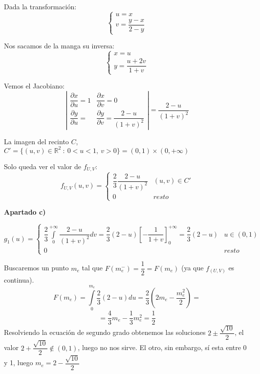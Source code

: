 \documentclass[openany]{book}
\begin{document}
\begin{exercise}
\begin{flushright}
\end{flushright}

    Dada la transformación:
    $$ \left\{
    \begin{array}{l}
        u=x\\
        v = \dfrac{y-x}{2-y}
    \end{array}
    \right. $$

    Nos sacamos de la manga su inversa:
    $$ \left\{
    \begin{array}{l}
        x=u\\
        y=\dfrac{u+2v}{1+v}
    \end{array}
    \right. $$

    Vemos el Jacobiano:
    $$\left| \begin{matrix} \dfrac{\partial x}{\partial u} = 1 & \dfrac{\partial x}{\partial v} = 0 \\ \dfrac{\partial y}{\partial u}= & \dfrac{\partial y}{\partial v} = \dfrac{2-u}{(1+v)^2} \end{matrix}\right| = \dfrac{2-u}{(1+v)^2}  $$

    La imagen del recinto $ C $, $ C'= \{(u,v) \in \mathbb{R}^2 \ :\ 0<u<1,\ v>0\} = (0,1) \times (0,+\infty) $
    
    Solo queda ver el valor de $ f_{U,V} $:
    $$ f_{U,V} (u,v)=\left\{
    \begin{array}{ll}
        \dfrac{2}{3} \dfrac{2-u}{(1+v)^2} & (u,v) \in C'\\
        0 & resto
    \end{array}
    \right.  $$

    \begin{flushright}
        \textbf{Apartado c)}
    \end{flushright}

    $$ g_{1}(u) = \left\{
    \begin{array}{ll}
        \dfrac{2}{3} \int\limits_{0}^{+\infty} \dfrac{2-u}{(1+v)^2}dv = \dfrac{2}{3}(2-u) \left[ - \dfrac{1}{1+v} \right]_{0}^{+\infty} = \dfrac{2}{3}(2-u) & u \in (0,1)\\
        0 & resto
    \end{array}
    \right. $$
    
    Buscaremos un punto $ m_{e} $ tal que $ F(m_{e}^{-}) = \dfrac{1}{2} = F(m_{e}) $ (ya que $ f_{(U,V)} $ es continua).
    $$ F(m_{e}) = \int\limits_{0}^{m_{e}} \dfrac{2}{3}(2-u) du = \dfrac{2}{3} \left( 2 m_{e} - \dfrac{m_{e}^2}{2} \right) = $$
    $$  = \dfrac{4}{3}m_{e} -\dfrac{1}{3}m_{e}^2 = \dfrac{1}{2} $$
    Resolviendo la ecuación de segundo grado obtenemos las soluciones $ 2 \pm \dfrac{\sqrt{10}}{2} $, el valor $ 2 + \dfrac{\sqrt{10}}{2} \not \in (0,1)$, luego no nos sirve. El otro, sin embargo, sí esta entre 0 y 1, luego $ m_{e} = 2- \dfrac{\sqrt{10}}{2} $


\end{exercise}
\end{document}

